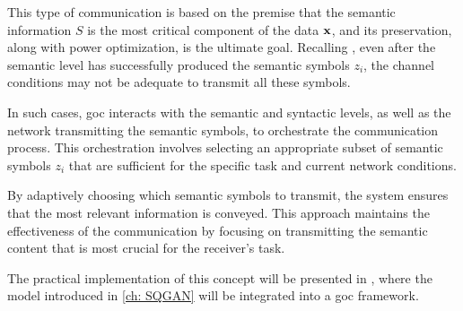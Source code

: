 This type of communication is based on the premise that the semantic information $S$ is the most critical component of the data $\mathbf{x}$, and its preservation, along with power optimization, is the ultimate goal. Recalling , even after the semantic level has successfully produced the semantic symbols $z_i$, the channel conditions may not be adequate to transmit all these symbols.

In such cases, \gls{goc} interacts with the semantic and syntactic levels, as well as the network transmitting the semantic symbols, to orchestrate the communication process. This orchestration involves selecting an appropriate subset of semantic symbols $z_i$ that are sufficient for the specific task and current network conditions.

By adaptively choosing which semantic symbols to transmit, the system ensures that the most relevant information is conveyed. This approach maintains the effectiveness of the communication by focusing on transmitting the semantic content that is most crucial for the receiver's task.

The practical implementation of this concept will be presented in , where the model introduced in \cref{ch: SQGAN} will be integrated into a \gls{goc} framework.




